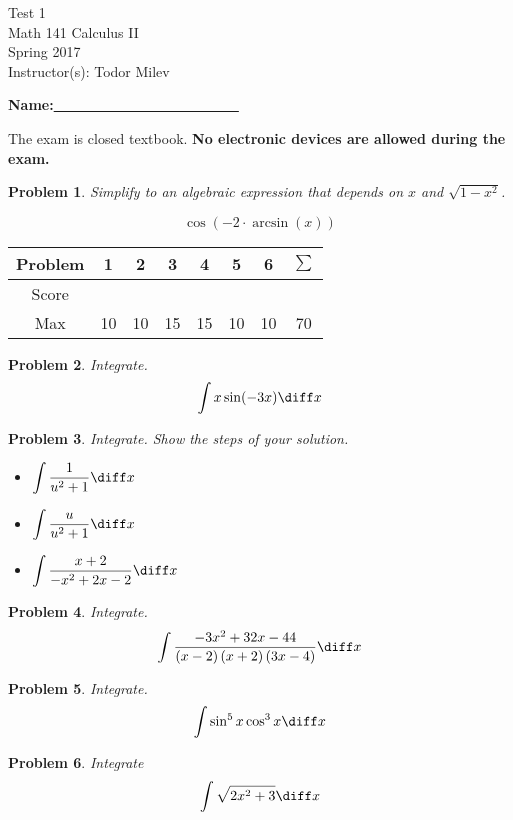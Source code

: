 \documentclass{article}
\newtheorem{problem}{Problem}
\begin{document}
\begin{center}
\Large
Test 1 \\ Math 141 Calculus II \\ \normalsize Spring 2017 \\ Instructor(s): Todor Milev
\end{center}
\noindent \textbf{Name:\underline{~~~~~~~~~~~~~~~~~~~~~~~} } \hfill{~}



\noindent The exam is closed textbook. \textbf{No electronic devices are allowed during the exam. }
\begin{problem}Simplify to an algebraic expression that depends on $x$ and $\sqrt {1-x^2}$.

\[\displaystyle \cos{}\left(-2\cdot \arcsin{}\left(x\right)\right)
\]
\end{problem}

\vfill
\hfill \begin{tabular}{c|c|c|c|c|c|c||c}
Problem&1 &2&3&4&5&6& $\sum$\\ \hline
Score&&&&&&&\\ \hline
Max&10&10&15&15&10&10&70
\end{tabular} 

\newpage
\begin{problem}
Integrate.
\[
\int x \sin (-3x)\diff x 
\] 
\end{problem}
\newpage
\begin{problem}
Integrate. Show the steps of your solution.
\begin{itemize}
\item $\displaystyle\int \frac{1}{u^2+1}\diff x$ 

\vskip 3cm
\item $\displaystyle\int \frac{u}{u^2+1}\diff x$

\vskip 3cm
\item $\displaystyle {\int \frac{x+2}{- x^{2}+2 x-2}\diff x}$

\end{itemize}
\end{problem}

\newpage
\begin{problem}
Integrate.
\[
 \int \frac{-3 x^{2}+32 x-44}{\left(x-2\right) \left(x+2\right) \left(3 x-4\right)}\diff x
\]
\end{problem}

\newpage
\begin{problem}
Integrate.
\[
\displaystyle \int \sin^5x \cos^3 x \diff x
\]
\end{problem}
\newpage
\begin{problem}
Integrate 
\[
\displaystyle {\int \sqrt{2 x^{2}+3}\diff x}
\]
\end{problem}
\end{document}
